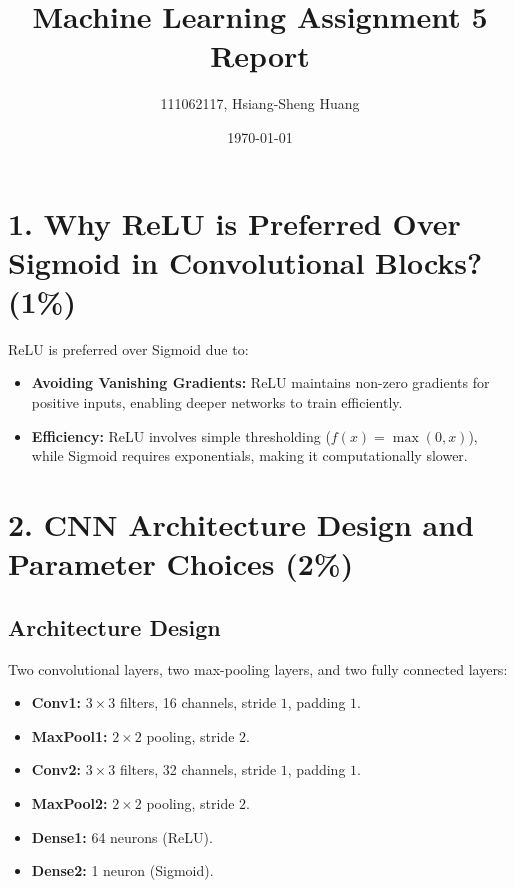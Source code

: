 \documentclass[12pt]{article}
\title{Machine Learning Assignment 5 Report}
\author{111062117, Hsiang-Sheng Huang}
\date{\today}
\begin{document}
\maketitle

\section*{1. Why ReLU is Preferred Over Sigmoid in Convolutional Blocks? (1\%)}

ReLU is preferred over Sigmoid due to:
\begin{itemize}[topsep=0pt, itemsep=0pt]
    \item \textbf{Avoiding Vanishing Gradients:} ReLU maintains non-zero gradients for positive inputs, enabling deeper networks to train efficiently.
    \item \textbf{Efficiency:} ReLU involves simple thresholding ($f(x) = \max(0, x)$), while Sigmoid requires exponentials, making it computationally slower.
\end{itemize}

\section*{2. CNN Architecture Design and Parameter Choices (2\%)}

\subsection*{Architecture Design}
Two convolutional layers, two max-pooling layers, and two fully connected layers:
\begin{itemize}[topsep=0pt, itemsep=0pt]
    \item \textbf{Conv1:} \(3 \times 3\) filters, 16 channels, stride \(1\), padding \(1\).
    \item \textbf{MaxPool1:} \(2 \times 2\) pooling, stride \(2\).
    \item \textbf{Conv2:} \(3 \times 3\) filters, 32 channels, stride \(1\), padding \(1\).
    \item \textbf{MaxPool2:} \(2 \times 2\) pooling, stride \(2\).
    \item \textbf{Dense1:} 64 neurons (ReLU).
    \item \textbf{Dense2:} 1 neuron (Sigmoid).
\end{itemize}
\end{document}
